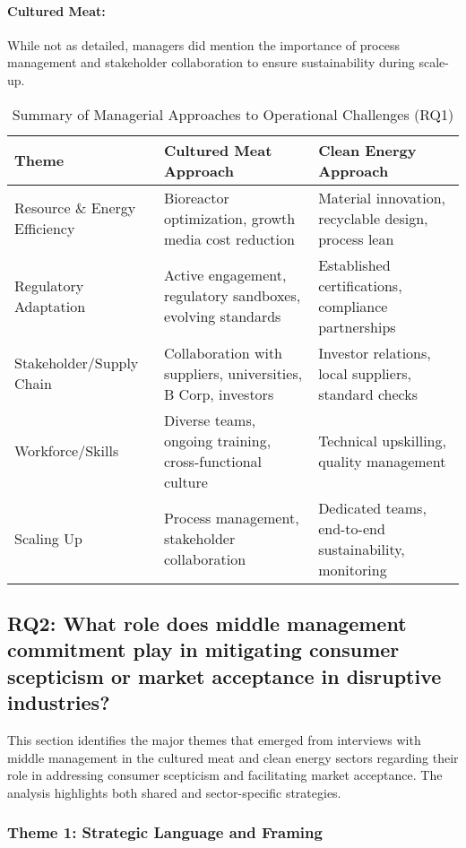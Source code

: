 \paragraph{Cultured Meat:} While not as detailed, managers did mention the importance of process management and stakeholder collaboration to ensure sustainability during scale-up.

\begin{table}[h!]
	\centering
	\caption{Summary of Managerial Approaches to Operational Challenges (RQ1)}
	\label{tab:rq1_summary}
	\begin{tabularx}{\textwidth}{@{}lXX@{}}
		\toprule
		\textbf{Theme} & \textbf{Cultured Meat Approach} & \textbf{Clean Energy Approach} \\
		\midrule
		Resource \& Energy Efficiency & Bioreactor optimization, growth media cost reduction & Material innovation, recyclable design, process lean \\
		\addlinespace
		Regulatory Adaptation & Active engagement, regulatory sandboxes, evolving standards & Established certifications, compliance partnerships \\
		\addlinespace
		Stakeholder/Supply Chain & Collaboration with suppliers, universities, B Corp, investors & Investor relations, local suppliers, standard checks \\
		\addlinespace
		Workforce/Skills & Diverse teams, ongoing training, cross-functional culture & Technical upskilling, quality management \\
		\addlinespace
		Scaling Up & Process management, stakeholder collaboration & Dedicated teams, end-to-end sustainability, monitoring \\
		\bottomrule
	\end{tabularx}
\end{table}

\subsection{RQ2: What role does middle management commitment play in mitigating consumer scepticism or market acceptance in disruptive industries?}
This section identifies the major themes that emerged from interviews with middle management in the cultured meat and clean energy sectors regarding their role in addressing consumer scepticism and facilitating market acceptance. The analysis highlights both shared and sector-specific strategies.

\subsubsection{Theme 1: Strategic Language and Framing}

